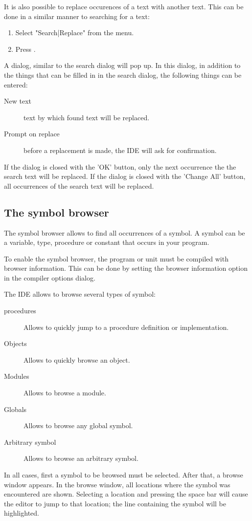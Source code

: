 It is also possible to replace occurences of a text with another text. 
This can be done in a similar manner to searching for a text:
\begin{enumerate}
\item Select "Search|Replace" from the menu.
\item Press .
\end{enumerate}
A dialog, similar to the search dialog will pop up.
In this dialog, in addition to the things that can be filled in in the
search dialog, the following things can be entered:
\begin{description}
\item [New text] text by which found text will be replaced.
\item [Prompt on replace] before a replacement is made, the IDE will ask for
confirmation.
\end{description}
If the dialog is closed with the 'OK' button, only the next occurrence the
the search text will be replaced. 
If the dialog is closed with the 'Change All' button, all occurrences of 
the search text will be replaced.

\subsection{The symbol browser}
\label{se:browser}
The symbol browser allows to find all occurrences of a symbol. A symbol 
can be a variable, type, procedure or constant that occurs in your program.

To enable the symbol browser, the program or unit must be compiled with
browser information. This can be done by setting the browser information
option in the compiler options dialog.

The IDE allows to browse several types of symbol:
\begin{description}
\item[procedures] Allows to quickly jump to a procedure definition or
implementation.
\item[Objects] Allows to quickly browse an object.
\item[Modules] Allows to browse a module.
\item[Globals] Allows to browse any global symbol.
\item[Arbitrary symbol] Allows to browse an arbitrary symbol.
\end{description}
In all cases, first a symbol to be browsed must be selected. After that,
a browse window appears. In the browse window, all locations where the 
symbol was encountered are shown. Selecting a location and pressing the
space bar will cause the editor to jump to that location; the line
containing the symbol will be highlighted. 

